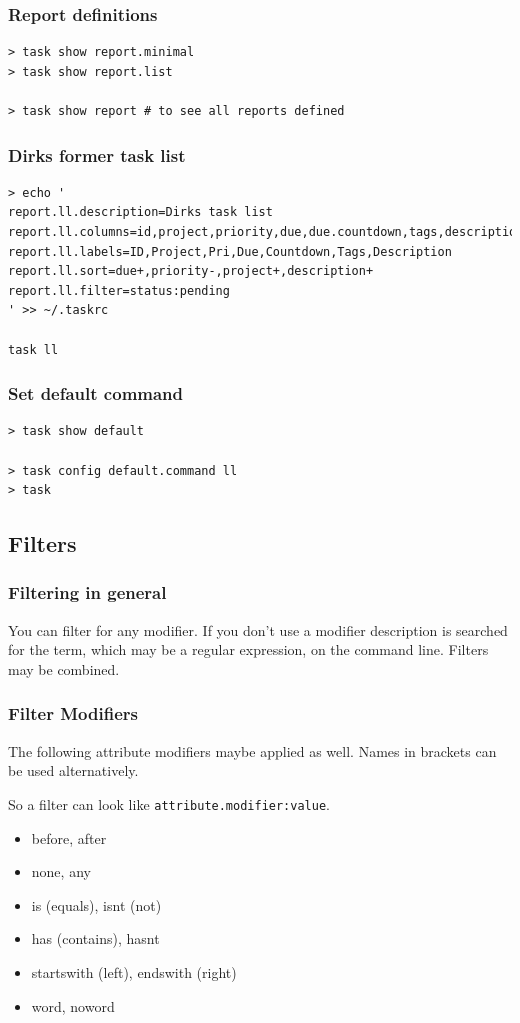 \documentclass[t,handout,aspectratio=169]{beamer}
\begin{document}
\begin{frame}[fragile]\frametitle{Report definitions}
    \vfill
    \begin{lstlisting}
> task show report.minimal
> task show report.list

> task show report # to see all reports defined\end{lstlisting}
\end{frame}

\begin{frame}[fragile]\frametitle{Dirks former task list}
    \vfill
    \begin{lstlisting}
> echo '
report.ll.description=Dirks task list
report.ll.columns=id,project,priority,due,due.countdown,tags,description
report.ll.labels=ID,Project,Pri,Due,Countdown,Tags,Description
report.ll.sort=due+,priority-,project+,description+
report.ll.filter=status:pending
' >> ~/.taskrc

task ll\end{lstlisting}
\end{frame}

\begin{frame}[fragile]\frametitle{Set default command}
    \vfill
    \begin{lstlisting}
> task show default

> task config default.command ll
> task\end{lstlisting}
\end{frame}

\subsection{Filters}

\begin{frame}[fragile]\frametitle{Filtering in general}
    \vfill
    You can filter for any modifier. If you don't use a modifier description is searched for the term, which may be a regular expression, on the command line. Filters may be combined.
\end{frame}

\begin{frame}[fragile]\frametitle{Filter Modifiers}
    \vfill
    The following attribute modifiers maybe applied as well. Names in brackets can be used alternatively.

    So a filter can look like \verb=attribute.modifier:value=. \pause

    \begin{itemize}
        \item before, after
        \item none, any
        \item is (equals), isnt (not)
        \item has (contains), hasnt
        \item startswith (left), endswith (right)
        \item word, noword
    \end{itemize}
\end{frame}
\end{document}
